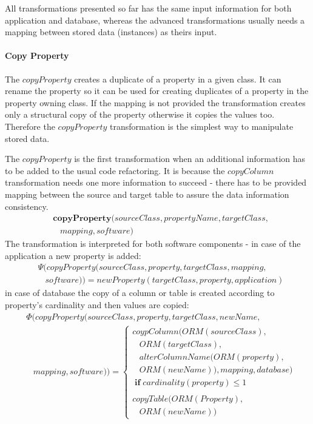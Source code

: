 \documentclass[11pt]{article}
\begin{document}
All transformations presented so far has the same input information for both application and database, whereas the advanced transformations usually needs a mapping between stored data (instances) as theirs input. 

\paragraph{Copy Property}
The $copyProperty$ creates a duplicate of a property in a given class. It can rename the property so it can be used for creating duplicates of a property in the property owning class. If the mapping is not provided the transformation creates only a structural copy of the property otherwise it copies the values too. Therefore the  $copyProperty$ transformation is the simplest way to manipulate stored data.

The  $copyProperty$ is the first transformation when an additional information has to be added to the usual code refactoring. It is because the $copyColumn$ transformation needs one more information to succeed - there has to be provided mapping between the source and target table to assure the data information consistency. %
\begin{align*}
& \mathbf{copyProperty}(sourceClass, propertyName, targetClass, \\
& \; \; \; mapping, software) 
\end{align*}
The transformation is interpreted for both software components - in case of the application a new property is added:
\begin{align*}
& \Psi(copyProperty(sourceClass, property, targetClass, mapping, \\ 
&  \; \; \; software)) = newProperty(targetClass, property, application) 
\end{align*}
in case of database the copy of a column or table is created according to property's cardinality and then values are copied:
\begin{align*}
& \Phi(copyProperty(sourceClass, property, targetClass, newName,  \\ 
&  \; \; \; mapping, software)) = \begin{cases}
 coypColumn(ORM(sourceClass),  \\ \;\;\; ORM(targetClass),  \\ \;\;\;alterColumnName(ORM(property), \\ \;\;\; ORM(newName)), mapping, database) \\ \; \mathbf{if} \; cardinality(property) \leq 1 \\\\
 copyTable(ORM(Property), \\ \;\;\; ORM(newName))
 \end{cases}
\end{align*}
\end{document}
